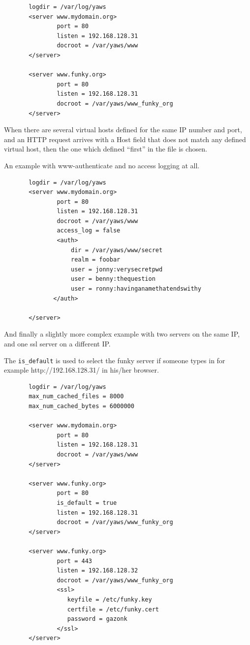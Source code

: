 \documentclass[11pt,oneside,english]{book}
\begin{document}
\begin{verbatim}
       logdir = /var/log/yaws
       <server www.mydomain.org>
               port = 80
               listen = 192.168.128.31
               docroot = /var/yaws/www
       </server>

       <server www.funky.org>
               port = 80
               listen = 192.168.128.31
               docroot = /var/yaws/www_funky_org
       </server>

\end{verbatim}



When there are several
virtual hosts defined for the same IP number and port,
and an HTTP request arrives with a Host field that does
not match any defined virtual host, then the one which
defined ``first'' in the file is chosen.


An example with www-authenticate and no access logging at all.

\begin{verbatim}
       logdir = /var/log/yaws
       <server www.mydomain.org>
               port = 80
               listen = 192.168.128.31
               docroot = /var/yaws/www
               access_log = false
               <auth>
                   dir = /var/yaws/www/secret
                   realm = foobar
                   user = jonny:verysecretpwd
                   user = benny:thequestion
                   user = ronny:havinganamethatendswithy
              </auth>

       </server>
\end{verbatim}

       And  finally  a  slightly more complex example with
       two servers on the same IP, and one ssl server on a
       different IP.

       The \verb+is_default+ is used to select the funky server if
       someone types in for example http://192.168.128.31/ in his/her
       browser.


\begin{verbatim}
       logdir = /var/log/yaws
       max_num_cached_files = 8000
       max_num_cached_bytes = 6000000

       <server www.mydomain.org>
               port = 80
               listen = 192.168.128.31
               docroot = /var/yaws/www
       </server>

       <server www.funky.org>
               port = 80
               is_default = true
               listen = 192.168.128.31
               docroot = /var/yaws/www_funky_org
       </server>

       <server www.funky.org>
               port = 443
               listen = 192.168.128.32
               docroot = /var/yaws/www_funky_org
               <ssl>
                  keyfile = /etc/funky.key
                  certfile = /etc/funky.cert
                  password = gazonk
               </ssl>
       </server>
\end{verbatim}
\end{document}
